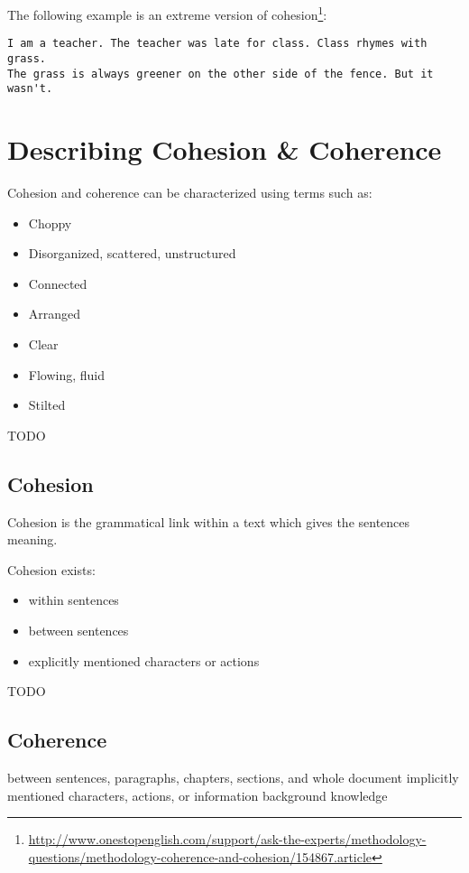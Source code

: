\documentclass[10pt,a4paper]{book}
\begin{document}
The following example is an extreme version of cohesion\footnote{\url{http://www.onestopenglish.com/support/ask-the-experts/methodology-questions/methodology-coherence-and-cohesion/154867.article}}:
\begin{verbatim}
I am a teacher. The teacher was late for class. Class rhymes with grass.
The grass is always greener on the other side of the fence. But it wasn't.
\end{verbatim}


\section{Describing Cohesion \& Coherence}

Cohesion and coherence can be characterized using terms such as:
\begin{itemize}
    \itemsep1pt\parskip0pt
    \item Choppy
    \item Disorganized, scattered, unstructured
    \item Connected
    \item Arranged
    \item Clear
    \item Flowing, fluid
    \item Stilted
\end{itemize}

\color{BrickRed}TODO\color{black}


\subsection{Cohesion}

Cohesion is the grammatical link within a text which gives the sentences meaning.

Cohesion exists:
\begin{itemize}
    \itemsep1pt\parskip0pt
    \item within sentences
    \item between sentences
    \item explicitly mentioned characters or actions
\end{itemize}

\color{BrickRed}TODO\color{black}


\subsection{Coherence}

between sentences, paragraphs, chapters, sections, and whole document
implicitly mentioned characters, actions, or information
background knowledge
\end{document}
